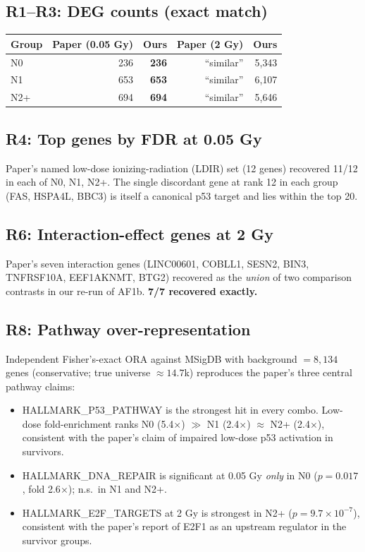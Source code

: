 \documentclass[11pt]{article}
\begin{document}
\subsection*{R1--R3: DEG counts (exact match)}

\begin{tabular}{lrrrr}
\toprule
Group & Paper (0.05 Gy) & Ours & Paper (2 Gy) & Ours \\
\midrule
N0  & 236 & \textbf{236} & ``similar'' & 5{,}343 \\
N1  & 653 & \textbf{653} & ``similar'' & 6{,}107 \\
N2+ & 694 & \textbf{694} & ``similar'' & 5{,}646 \\
\bottomrule
\end{tabular}

\subsection*{R4: Top genes by FDR at 0.05 Gy}
Paper's named low-dose ionizing-radiation (LDIR) set (12 genes) recovered 11/12 in each of N0, N1, N2+. The single discordant gene at rank 12 in each group (FAS, HSPA4L, BBC3) is itself a canonical p53 target and lies within the top 20.

\subsection*{R6: Interaction-effect genes at 2 Gy}
Paper's seven interaction genes (LINC00601, COBLL1, SESN2, BIN3, TNFRSF10A, EEF1AKNMT, BTG2) recovered as the \emph{union} of two comparison contrasts in our re-run of AF1b. \textbf{7/7 recovered exactly.}

\subsection*{R8: Pathway over-representation}
Independent Fisher's-exact ORA against MSigDB with background $= 8{,}134$ genes (conservative; true universe $\approx 14.7$k) reproduces the paper's three central pathway claims:
\begin{itemize}
    \item HALLMARK\_P53\_PATHWAY is the strongest hit in every combo. Low-dose fold-enrichment ranks N0 (5.4$\times$) $\gg$ N1 (2.4$\times$) $\approx$ N2+ (2.4$\times$), consistent with the paper's claim of impaired low-dose p53 activation in survivors.
    \item HALLMARK\_DNA\_REPAIR is significant at 0.05 Gy \emph{only} in N0 ($p=0.017$, fold 2.6$\times$); n.s.\ in N1 and N2+.
    \item HALLMARK\_E2F\_TARGETS at 2 Gy is strongest in N2+ ($p=9.7\times 10^{-7}$), consistent with the paper's report of E2F1 as an upstream regulator in the survivor groups.
\end{itemize}
\end{document}
